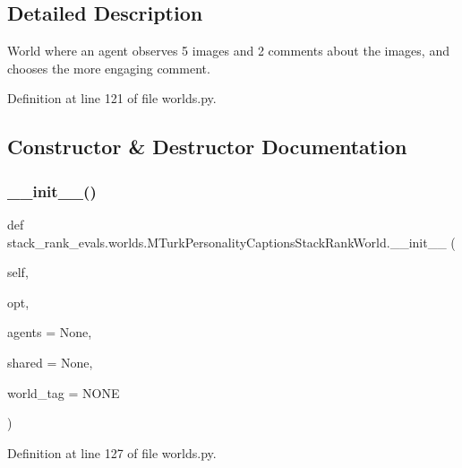 \subsection{Detailed Description}
\begin{DoxyVerb}World where an agent observes 5 images and 2 comments about the images, and chooses
the more engaging comment.
\end{DoxyVerb}
 

Definition at line 121 of file worlds.\+py.



\subsection{Constructor \& Destructor Documentation}
\mbox{\label{classstack__rank__evals_1_1worlds_1_1MTurkPersonalityCaptionsStackRankWorld_ac193f25378717137c8681550c972be8a}} 
\subsubsection{\texorpdfstring{\+\_\+\+\_\+init\+\_\+\+\_\+()}{\_\_init\_\_()}}
{\footnotesize\ttfamily def stack\+\_\+rank\+\_\+evals.\+worlds.\+M\+Turk\+Personality\+Captions\+Stack\+Rank\+World.\+\_\+\+\_\+init\+\_\+\+\_\+ (\begin{DoxyParamCaption}\item[{}]{self,  }\item[{}]{opt,  }\item[{}]{agents = {\ttfamily None},  }\item[{}]{shared = {\ttfamily None},  }\item[{}]{world\+\_\+tag = {\ttfamily \textquotesingle{}NONE\textquotesingle{}} }\end{DoxyParamCaption})}



Definition at line 127 of file worlds.\+py.


